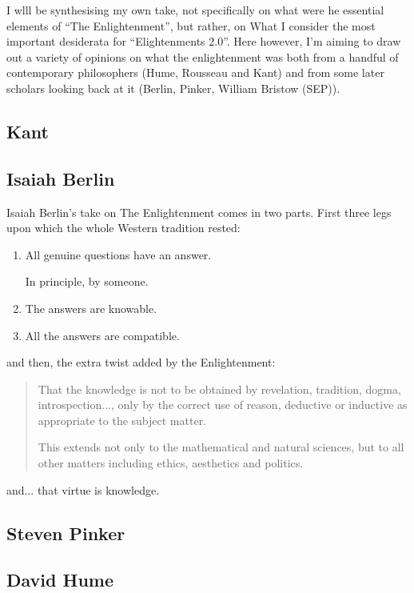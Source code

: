 \documentclass[10pt,titlepage]{article}
\begin{document}
I wlll be synthesising my own take, not specifically on what were he essential elements of ``The Enlightenment'', but rather, on What I consider the  most important desiderata for ``Elightenments 2.0''.
Here however, I'm aiming to draw out a variety of opinions on what the enlightenment was both from a handful of contemporary philosophers (Hume, Rousseau and Kant) and from some later scholars looking back at it (Berlin, Pinker, William Bristow (SEP)).

\subsection{Kant}

\subsection{Isaiah Berlin}

Isaiah Berlin's take on The Enlightenment\cite{berlinRR} comes in two parts.
First three legs upon which the whole Western tradition rested:
\begin{enumerate}
  \item All genuine questions have an answer.

    In principle, by someone.
\item  The answers are knowable.
\item All the answers are compatible.
\end{enumerate}

and then, the extra twist added by the Enlightenment:
\begin{quotation}
That the knowledge is not to be obtained by revelation, tradition, dogma, introspection..., only by the correct use of reason, deductive or inductive as appropriate to the subject matter.

This extends not only to the mathematical and natural sciences, but to all other matters including ethics, aesthetics and politics.
\end{quotation}
and... that virtue is knowledge.


\subsection{Steven Pinker}

\subsection{David Hume}
\end{document}
